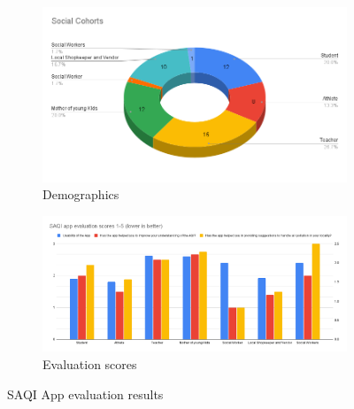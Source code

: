 \begin{figure}
    \centering
    \begin{subfigure}[b]{0.38\textwidth}
        \centering
        \includegraphics[width=\textwidth]{figures/evaluation2.png}
        \caption{Demographics}
        \label{fig:demographics_evaluation}
    \end{subfigure}
    \hfill
    \begin{subfigure}[b]{0.6\textwidth}
         \centering
         \includegraphics[width=\textwidth]{figures/evaluation.png}
         \caption{Evaluation scores}
         \label{fig:scores_evaluation}
     \end{subfigure}
    \caption{SAQI App evaluation results}
    \label{fig:evaluation}
\end{figure}





